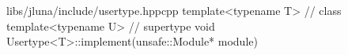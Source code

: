 \begin{fileminted}{libs/jluna/include/usertype.hpp}{cpp}
template<typename T> // class
template<typename U> // supertype
void Usertype<T>::implement(unsafe::Module* module)
\end{fileminted}
